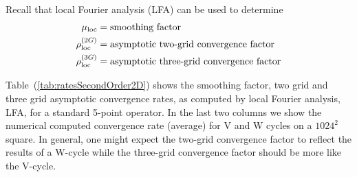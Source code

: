 
\newcommand{\muLoc}{\mu_{\rm loc}}
\newcommand{\rhoLoc}{\rho_{\rm loc}}
\newcommand{\rhoLocTwoGrid}{\rhoLoc^{(2G)}}
\newcommand{\rhoLocThreeGrid}{\rhoLoc^{(3G)}}

Recall that local Fourier analysis (LFA) can be used to determine 
\begin{align*}
  \muLoc &=  \mbox{smoothing factor} \\
  \rhoLocTwoGrid &= \mbox{asymptotic two-grid convergence factor} \\ 
  \rhoLocThreeGrid &= \mbox{asymptotic three-grid convergence factor} 
\end{align*}

Table~(\ref{tab:ratesSecondOrder2D}) shows the smoothing factor,
two grid and three grid asymptotic convergence rates, as computed by local Fourier analysis, LFA,
for a standard 5-point operator. In the last two columns we show the numerical computed convergence
rate (average) for V and W cycles on a $1024^2$ square.
In general, one might expect the two-grid convergence factor to reflect the results of a W-cycle
while the three-grid convergence factor should be more like the V-cycle.

